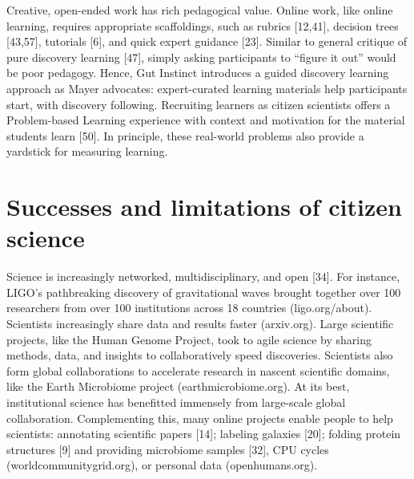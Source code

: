 Creative, open-ended work has rich pedagogical value.
Online work, like online learning, requires appropriate
scaffoldings, such as rubrics [12,41], decision trees [43,57],
tutorials [6], and quick expert guidance [23]. Similar to
general critique of pure discovery learning [47], simply
asking participants to “figure it out” would be poor pedagogy. Hence, Gut Instinct introduces a guided discovery
learning approach as Mayer advocates: expert-curated
learning materials help participants start, with discovery
following. Recruiting learners as citizen scientists offers a
Problem-based Learning experience with context and motivation for the material students learn [50]. In principle,
these real-world problems also provide a yardstick for
measuring learning. 


\section{Successes and limitations of citizen science}
Science is increasingly networked, multidisciplinary, and
open [34]. For instance, LIGO’s pathbreaking discovery of
gravitational waves brought together over 100 researchers
from over 100 institutions across 18 countries (ligo.org/about). 
Scientists increasingly share data and results faster (arxiv.org). 
Large scientific projects, like the Human Genome Project, 
took to agile science by sharing methods, data, and insights to 
collaboratively speed discoveries. Scientists also form global 
collaborations to accelerate research in nascent scientific domains, 
like the Earth Microbiome project (earthmicrobiome.org).
At its best, institutional science has benefitted immensely
from large-scale global collaboration. Complementing this,
many online projects enable people to help scientists: annotating scientific papers [14]; 
labeling galaxies [20]; folding protein structures [9] and providing microbiome samples
[32], CPU cycles (worldcommunitygrid.org), or personal data
(openhumans.org). 

